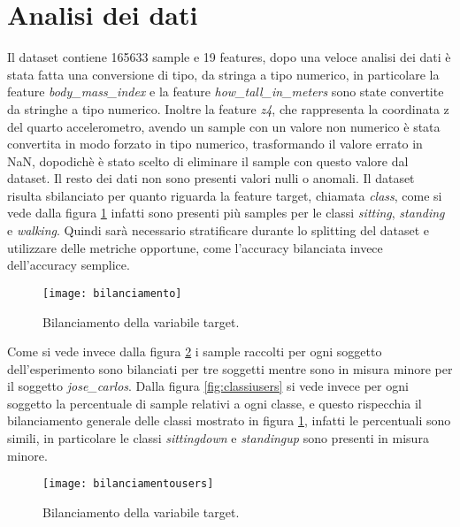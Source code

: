 \section{Analisi dei dati}\label{sec:analisi}

Il dataset \cite{datasetarticle} contiene 165633 sample e 19 features, dopo una veloce analisi dei dati è stata fatta una conversione di tipo, da stringa a tipo numerico, in particolare la feature \textit{body\_mass\_index} e la feature \textit{how\_tall\_in\_meters} sono state convertite da stringhe a tipo numerico. Inoltre la feature \textit{z4}, che rappresenta la coordinata z del quarto accelerometro, avendo un sample con un valore non numerico è stata convertita in modo forzato in tipo numerico, trasformando il valore errato in NaN, dopodichè è stato scelto di eliminare il sample con questo valore dal dataset.  Il resto dei dati non sono presenti valori nulli o anomali.
Il dataset risulta sbilanciato per quanto riguarda la feature target, chiamata \textit{class}, come si vede dalla figura \ref{fig:bilanciamento} infatti sono presenti più samples per le classi \textit{sitting}, \textit{standing} e \textit{walking}. Quindi sarà necessario stratificare durante lo splitting del dataset e utilizzare delle metriche opportune, come l'accuracy bilanciata invece dell'accuracy semplice.

\begin{figure}[h]
    \centering\texttt{[image: bilanciamento]}
    \caption{Bilanciamento della variabile target.}
    \label{fig:bilanciamento}
\end{figure}

Come si vede invece dalla figura \ref{fig:bilanciamentousers} i sample raccolti per ogni soggetto dell'esperimento sono bilanciati per tre soggetti mentre sono in misura minore per il soggetto \textit{jose\_carlos}. Dalla figura \ref{fig:classiusers} si vede invece per ogni soggetto la percentuale di sample relativi a ogni classe, e questo rispecchia il bilanciamento generale delle classi mostrato in figura \ref{fig:bilanciamento}, infatti le percentuali sono simili, in particolare le classi \textit{sittingdown} e \textit{standingup} sono presenti in misura minore.

\begin{figure}[h]
    \centering\texttt{[image: bilanciamentousers]}
    \caption{Bilanciamento della variabile target.}
    \label{fig:bilanciamentousers}
\end{figure}

